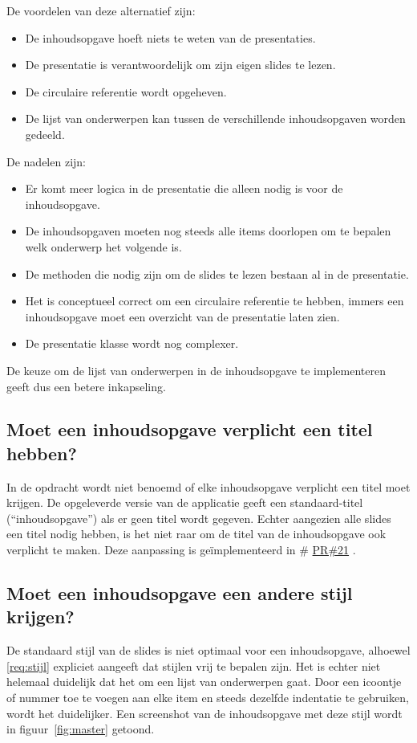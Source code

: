 \documentclass[a4paper]{article}
\makeatletter
\newcommand*{\repo}{\begingroup\@makeother\#\@repo}
\newcommand*{\@repo}[2]{%
  \href{https://github.com/DanielSchiavini/design-patterns-assignment/#1}{#2}%
  \endgroup}
\newcommand{\PR}[1]{\repo{pull/#1}{PR\##1}}
\newcommand{\reqref}[1]{\ref{req:#1}}
\newcommand{\question}[1]{
  \subsection{#1}
}
\makeatother
\begin{document}
		De voordelen van deze alternatief zijn:
		\begin{itemize}
			\item De inhoudsopgave hoeft niets te weten van de presentaties.
			\item De presentatie is verantwoordelijk om zijn eigen slides te lezen.
			\item De circulaire referentie wordt opgeheven.
			\item De lijst van onderwerpen kan tussen de verschillende inhoudsopgaven worden gedeeld.
		\end{itemize}

		De nadelen zijn:
		\begin{itemize}
			\item Er komt meer logica in de presentatie die alleen nodig is voor de in\-houds\-op\-gave.
			\item De inhoudsopgaven moeten nog steeds alle items doorlopen om te bepalen welk onderwerp het volgende is.
			\item De methoden die nodig zijn om de slides te lezen bestaan al in de presentatie.
			\item Het is conceptueel correct om een circulaire referentie te hebben, immers een inhoudsopgave moet een overzicht van de presentatie laten zien.
			\item De presentatie klasse wordt nog complexer.
		\end{itemize}

		De keuze om de lijst van onderwerpen in de inhoudsopgave te implementeren geeft dus een betere inkapseling.

    \question{Moet een inhoudsopgave verplicht een titel hebben?}
		In de opdracht wordt niet benoemd of elke inhoudsopgave verplicht een titel moet krijgen.
		De opgeleverde versie van de applicatie geeft een standaard-titel (``inhoudsopgave'') als er geen titel wordt gegeven.
		Echter aangezien alle slides een titel nodig hebben, is het niet raar om de titel van de inhoudsopgave ook verplicht te maken.
		Deze aanpassing is geïmplementeerd in \PR{21}.
    
    \question{Moet een inhoudsopgave een andere stijl krijgen?}
		De standaard stijl van de slides is niet optimaal voor een inhoudsopgave, alhoewel \reqref{stijl} expliciet aangeeft dat stijlen vrij te bepalen zijn.
		Het is echter niet helemaal duidelijk dat het om een lijst van onderwerpen gaat.
		Door een icoontje of nummer toe te voegen aan elke item en steeds dezelfde indentatie te gebruiken, wordt het duidelijker.
		Een screenshot van de inhoudsopgave met deze stijl wordt in figuur~\ref{fig:master} getoond.
\end{document}

